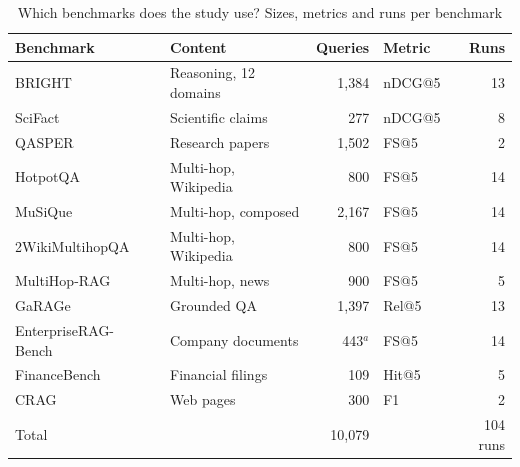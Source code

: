 \begin{table}[t]
\centering
\caption{Which benchmarks does the study use? Sizes, metrics and runs per benchmark}\label{tab:bench}
\scriptsize\setlength{\tabcolsep}{3pt}
\begin{tabular}{@{}l l r l r@{}}\toprule
Benchmark & Content & Queries & Metric & Runs\\
\midrule
BRIGHT~\cite{su2025bright} & Reasoning, 12 domains & 1,384 & nDCG@5 & 13\\
SciFact~\cite{wadden2020scifact} & Scientific claims & 277 & nDCG@5 & 8\\
QASPER~\cite{dasigi2021qasper} & Research papers & 1,502 & FS@5 & 2\\
HotpotQA~\cite{yang2018hotpotqa} & Multi-hop, Wikipedia & 800 & FS@5 & 14\\
MuSiQue~\cite{trivedi2022musique} & Multi-hop, composed & 2,167 & FS@5 & 14\\
2WikiMultihopQA~\cite{ho2020twowiki} & Multi-hop, Wikipedia & 800 & FS@5 & 14\\
MultiHop-RAG~\cite{tang2024multihoprag} & Multi-hop, news & 900 & FS@5 & 5\\
GaRAGe~\cite{sorodoc2025garage} & Grounded QA & 1,397 & Rel@5 & 13\\
EnterpriseRAG-Bench~\cite{sun2026enterpriserag} & Company documents & 443$^a$ & FS@5 & 14\\
FinanceBench~\cite{islam2023financebench} & Financial filings & 109 & Hit@5 & 5\\
CRAG~\cite{yang2024crag} & Web pages & 300 & F1 & 2\\
\midrule Total & & 10,079 & & 104 runs\\
\bottomrule\end{tabular}
\end{table}
